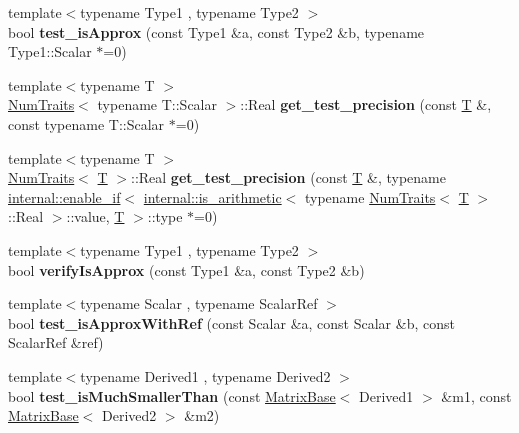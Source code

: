 \begin{DoxyCompactItemize}
{\footnotesize template$<$typename Type1 , typename Type2 $>$ }\\bool {\bfseries test\+\_\+is\+Approx} (const Type1 \&a, const Type2 \&b, typename Type1\+::\+Scalar $\ast$=0)
\item 
\mbox{\label{namespace_eigen_a5b967cdd6248237b53191013ecb8e4e6}} 
{\footnotesize template$<$typename T $>$ }\\\hyperlink{group___core___module_struct_eigen_1_1_num_traits}{Num\+Traits}$<$ typename T\+::\+Scalar $>$\+::Real {\bfseries get\+\_\+test\+\_\+precision} (const \hyperlink{group___sparse_core___module}{T} \&, const typename T\+::\+Scalar $\ast$=0)
\item 
\mbox{\label{namespace_eigen_a37a5192c003ee01724cc3a9a9a56dca7}} 
{\footnotesize template$<$typename T $>$ }\\\hyperlink{group___core___module_struct_eigen_1_1_num_traits}{Num\+Traits}$<$ \hyperlink{group___sparse_core___module}{T} $>$\+::Real {\bfseries get\+\_\+test\+\_\+precision} (const \hyperlink{group___sparse_core___module}{T} \&, typename \hyperlink{struct_eigen_1_1internal_1_1enable__if}{internal\+::enable\+\_\+if}$<$ \hyperlink{struct_eigen_1_1internal_1_1is__arithmetic}{internal\+::is\+\_\+arithmetic}$<$ typename \hyperlink{group___core___module_struct_eigen_1_1_num_traits}{Num\+Traits}$<$ \hyperlink{group___sparse_core___module}{T} $>$\+::Real $>$\+::value, \hyperlink{group___sparse_core___module}{T} $>$\+::type $\ast$=0)
\item 
\mbox{\label{namespace_eigen_a7a1a0a2e015838382b95725487e0ef7e}} 
{\footnotesize template$<$typename Type1 , typename Type2 $>$ }\\bool {\bfseries verify\+Is\+Approx} (const Type1 \&a, const Type2 \&b)
\item 
\mbox{\label{namespace_eigen_ac629f5f03405251bde5776a443935e32}} 
{\footnotesize template$<$typename Scalar , typename Scalar\+Ref $>$ }\\bool {\bfseries test\+\_\+is\+Approx\+With\+Ref} (const Scalar \&a, const Scalar \&b, const Scalar\+Ref \&ref)
\item 
\mbox{\label{namespace_eigen_ab6d71953497863f9720bbb91c61ef03b}} 
{\footnotesize template$<$typename Derived1 , typename Derived2 $>$ }\\bool {\bfseries test\+\_\+is\+Much\+Smaller\+Than} (const \hyperlink{group___core___module_class_eigen_1_1_matrix_base}{Matrix\+Base}$<$ Derived1 $>$ \&m1, const \hyperlink{group___core___module_class_eigen_1_1_matrix_base}{Matrix\+Base}$<$ Derived2 $>$ \&m2)

\end{DoxyCompactItemize}
